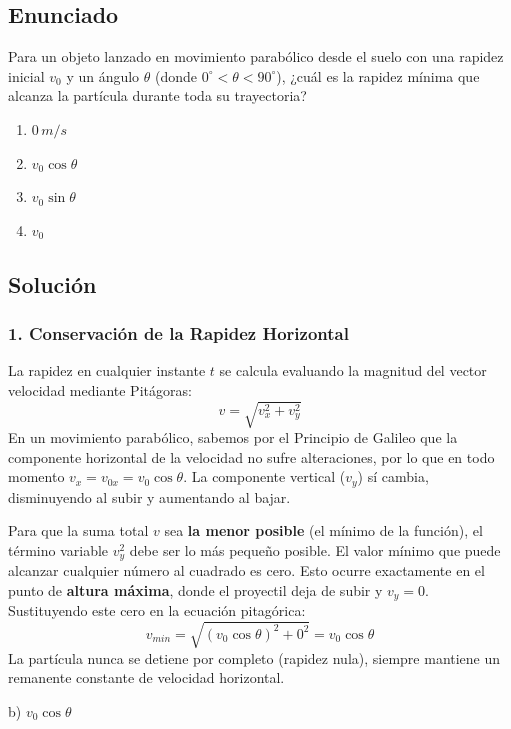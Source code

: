 \documentclass[12pt, a4paper]{article}
\begin{document}
\newpage

\subsection*{Enunciado}
Para un objeto lanzado en movimiento parabólico desde el suelo con una rapidez inicial $v_0$ y un ángulo $\theta$ (donde $0^\circ < \theta < 90^\circ$), ¿cuál es la rapidez mínima que alcanza la partícula durante toda su trayectoria?
\begin{enumerate}[label=\alph*)]
    \item $0\,\si{m/s}$
    \item $v_0 \cos\theta$
    \item $v_0 \sin\theta$
    \item $v_0$
\end{enumerate}

\subsection*{Solución}

\subsubsection*{1. Conservación de la Rapidez Horizontal}
La rapidez en cualquier instante $t$ se calcula evaluando la magnitud del vector velocidad mediante Pitágoras:
$$ v = \sqrt{v_x^2 + v_y^2} $$
En un movimiento parabólico, sabemos por el Principio de Galileo que la componente horizontal de la velocidad no sufre alteraciones, por lo que en todo momento $v_x = v_{0x} = v_0 \cos\theta$.
La componente vertical ($v_y$) sí cambia, disminuyendo al subir y aumentando al bajar. 

Para que la suma total $v$ sea \textbf{la menor posible} (el mínimo de la función), el término variable $v_y^2$ debe ser lo más pequeño posible. El valor mínimo que puede alcanzar cualquier número al cuadrado es cero. 
Esto ocurre exactamente en el punto de \textbf{altura máxima}, donde el proyectil deja de subir y $v_y = 0$.
Sustituyendo este cero en la ecuación pitagórica:
$$ v_{min} = \sqrt{(v_0 \cos\theta)^2 + 0^2} = v_0 \cos\theta $$
La partícula nunca se detiene por completo (rapidez nula), siempre mantiene un remanente constante de velocidad horizontal.

\begin{tcolorbox}[colback=green!5!white, colframe=green!50!black, title=Respuesta Final]
\centering \Large b) $v_0 \cos\theta$
\end{tcolorbox}
\end{document}
